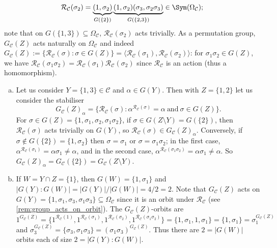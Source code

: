 \begin{example}
\begin{itemize}
              $$\mathcal{R}_\mathcal{C}(\sigma_2) = \underbrace{(1,\sigma_2)}_{G(\{2\})}\underbrace{(1,\sigma_2)(\sigma_3,\sigma_2\sigma_3)}_{G(\{2,3\})} \in \Sym(\Omega_\mathcal{C});$$
              note that on $G(\{1,3\}) \subseteq \Omega_\mathcal{C}$, $\mathcal{R}_\mathcal{C}(\sigma_2)$ acts trivially. As a permutation group, $G_\mathcal{C}(Z)$ acts naturally on $\Omega_\mathcal{C}$ and indeed $G_\mathcal{C}(Z) := \{\mathcal{R}_\mathcal{C}(\sigma) : \sigma \in G(Z)\} = \langle\mathcal{R}_\mathcal{C}(\sigma_1),\mathcal{R}_\mathcal{C}(\sigma_2)\rangle$: for $\sigma_1\sigma_2 \in G(Z)$, we have $\mathcal{R}_\mathcal{C}(\sigma_1\sigma_2) = \mathcal{R}_\mathcal{C}(\sigma_1)\mathcal{R}_\mathcal{C}(\sigma_2)$ since $\mathcal{R}_\mathcal{C}$ is an action (thus a homomorphism).
    \end{itemize}
    \begin{enumerate}[(a)]
        \item Let us consider $Y = \{1,3\} \in \mathcal{C}$ and $\alpha \in G(Y)$. Then with $Z = \{1,2\}$ let us consider the stabiliser
              $$G_\mathcal{C}(Z)_\alpha = \{\mathcal{R}_\mathcal{C}(\sigma) : \alpha^{\mathcal{R}_\mathcal{C}(\sigma)} = \alpha\ \text{and}\ \sigma \in G(Z)\}.$$
              For $\sigma \in G(Z) = \{1,\sigma_1,\sigma_2,\sigma_1\sigma_2\}$, if $\sigma \in G(Z \setminus Y) = G(\{2\})$, then $\mathcal{R}_\mathcal{C}(\sigma)$ acts trivially on $G(Y)$, so $\mathcal{R}_\mathcal{C}(\sigma) \in G_\mathcal{C}(Z)_\alpha$. Conversely, if $\sigma \not\in G(\{2\}) = \{1,\sigma_2\}$ then $\sigma = \sigma_1$ or $\sigma = \sigma_1\sigma_2$; in the first case, $\alpha^{\mathcal{R}_\mathcal{C}(\sigma_1)} = \alpha\sigma_1 \neq \alpha$, and in the second case, $\alpha^{\mathcal{R}_\mathcal{C}(\sigma_1\sigma_2)} = \alpha\sigma_1 \neq \alpha$. So $G_\mathcal{C}(Z)_\alpha = G_\mathcal{C}(\{2\}) = G_\mathcal{C}(Z \setminus Y)$.
        \item If $W = Y \cap Z = \{1\}$, then $G(W) = \{1,\sigma_1\}$ and $|G(Y) : G(W)| = |G(Y)|/|G(W)| = 4/2 = 2$. Note that $G_\mathcal{C}(Z)$ acts on $G(Y) = \{1,\sigma_1,\sigma_3,\sigma_1\sigma_3\} \subseteq \Omega_\mathcal{C}$ since it is an orbit under $\mathcal{R}_\mathcal{C}$ (see \autoref{rem:group_acts_on_orbit}). The $G_\mathcal{C}(Z)$-orbits are
              $$1^{G_\mathcal{C}(Z)} = \{1^{\mathcal{R}_\mathcal{C}(1)},1^{\mathcal{R}_\mathcal{C}(\sigma_1)},1^{\mathcal{R}_\mathcal{C}(\sigma_2)},1^{\mathcal{R}_\mathcal{C}(\sigma_1\sigma_2)}\} = \{1,\sigma_1,1,\sigma_1\} = \{1,\sigma_1\} = \sigma_1^{G_\mathcal{C}(Z)}$$
              and $\sigma_3^{G_\mathcal{C}(Z)} = \{\sigma_3,\sigma_1\sigma_3\} = (\sigma_1\sigma_3)^{G_\mathcal{C}(Z)}$. Thus there are $2 = |G(W)|$ orbits each of size $2 = |G(Y) : G(W)|$.
    \end{enumerate}
\end{example}

